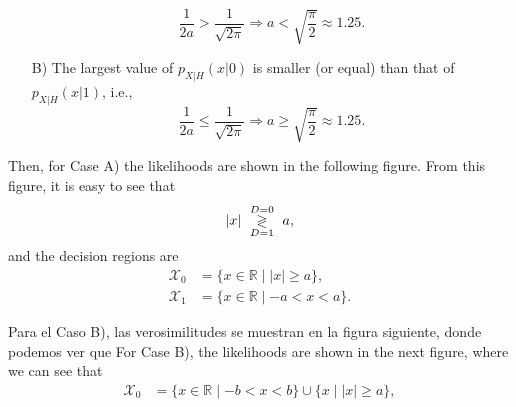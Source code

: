 \begin{parts}
\begin{solution}
\begin{enumerate}
  \begin{equation*}
    \frac{1}{2 a} > \frac{1}{\sqrt{2 \pi}} \Rightarrow a < \sqrt{\frac{\pi}{2}} \approx 1.25.
  \end{equation*}
  \item[B)] The largest value of $p_{X|H}(x|0)$ is smaller (or equal) than that of $p_{X|H}(x|1)$, i.e.,
  \begin{equation*}
    \frac{1}{2 a} \leq \frac{1}{\sqrt{2 \pi}} \Rightarrow a \geq \sqrt{\frac{\pi}{2}} \approx 1.25.
  \end{equation*}
\end{enumerate}
Then, for Case A) the likelihoods are shown in the following figure. From this figure, it is easy to see that
\begin{equation*}
|x| \,\, \underset{D=1}{\overset{D=0}{\gtrless}}\,\, a,
\end{equation*}
and the decision regions are
\fi
\begin{align*}
\mathcal{X}_0 &= \{x \in \mathbb{R}  \mid |x| \geq a \},  \\
\mathcal{X}_1 &= \{x \in \mathbb{R}  \mid -a < x  < a \}.
\end{align*}
\begin{center}
	\end{center}
\ifspanish Para el Caso B), las verosimilitudes se muestran en la figura siguiente, donde podemos ver que
\else For Case B), the likelihoods are shown in the next figure, where we can see that
\fi
\begin{align*}
\mathcal{X}_0 &= \{x \in \mathbb{R} \mid -b < x < b \} \cup \{x  \mid |x| \geq a \},  \\

\end{align*}
\end{solution}
\end{parts}
